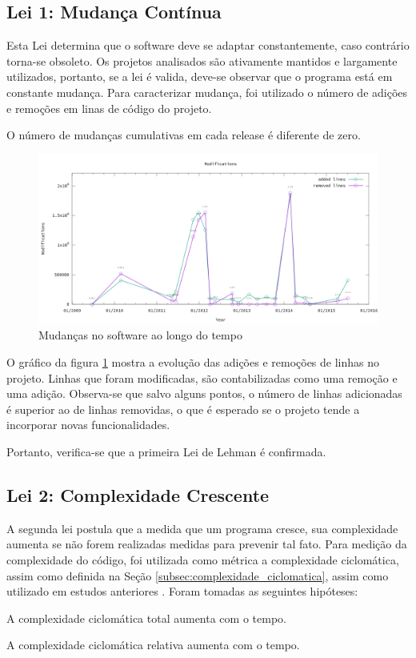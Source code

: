 \subsection{Lei 1: Mudança Contínua}
Esta Lei determina que o software deve se adaptar constantemente, caso contrário torna-se obsoleto. Os projetos analisados são ativamente mantidos e largamente utilizados, portanto, se a lei é valida, deve-se observar que o programa está em constante mudança. Para caracterizar mudança, foi utilizado o número de adições e remoções em linas de código do projeto. 
\begin{hypothesis}
	O número de mudanças cumulativas em cada release é diferente de zero.
\end{hypothesis}
\begin{figure}[h]
	\centering
	\includegraphics[width=0.9\linewidth]{figure/Modifications}
	\caption{Mudanças no software ao longo do tempo}
	\label{fig:modifications}
\end{figure}
O gráfico da figura \ref{fig:modifications} mostra a evolução das adições e remoções de linhas no projeto. Linhas que foram modificadas, são contabilizadas como uma remoção e uma adição. Observa-se que salvo alguns pontos, o número de linhas adicionadas é superior ao de linhas removidas, o que é esperado se o projeto tende a incorporar novas funcionalidades.

Portanto, verifica-se que a primeira Lei de Lehman é confirmada.

\subsection{Lei 2: Complexidade Crescente}
A segunda lei postula que a medida que um programa cresce, sua complexidade aumenta se não forem realizadas medidas para prevenir tal fato. Para medição da complexidade do código, foi utilizada como métrica a complexidade ciclomática, assim como definida na Seção \ref{subsec:complexidade_ciclomatica}, assim como utilizado em estudos anteriores \cite{israeli2010linux,neamtiu2013towards,skoulis2014open}.
Foram tomadas as seguintes hipóteses:
\begin{hypothesis}
	A complexidade ciclomática total aumenta com o tempo.
\end{hypothesis}
\begin{hypothesis}
	A complexidade ciclomática relativa aumenta com o tempo.
\end{hypothesis}

